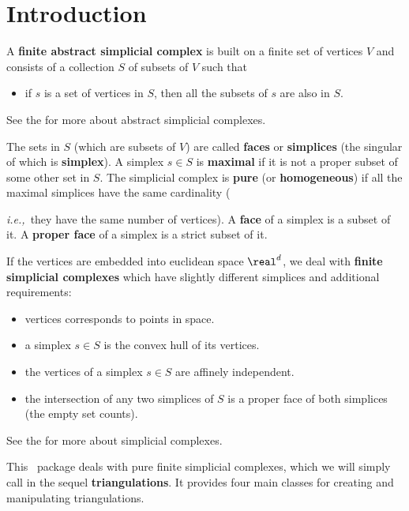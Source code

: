{

\def\note#1{ {\color{red}
  \textsf{$\langle\!\langle${#1}$\rangle\!\rangle$}}
}

\section{Introduction\label{triangulation:intro}}

A \textbf{finite abstract simplicial complex} is built on a finite set of
vertices $V$ and consists of a collection $S$ of subsets of $V$ such that
\begin{itemize}
\item if $s$ is a set of vertices in $S$, then all the subsets of $s$ are also
in $S$.
\end{itemize}
See the
 for more about abstract simplicial complexes.

The sets in $S$ (which are subsets of $V$) are called
\textbf{faces} or \textbf{simplices} (the
singular of which is \textbf{simplex}).
%
A simplex $s\in S$ is \textbf{maximal} if it is not a proper subset of some other
set in $S$. The simplicial complex is \textbf{pure} (or \textbf{homogeneous})
if all the maximal simplices have the same cardinality ({\emph{i.e.,}\ they have the same
number of vertices). A \textbf{face} of a simplex is a subset of it. A
\textbf{proper face} of a simplex is a strict subset of it.

If the vertices are embedded into euclidean space $\real^d$, we deal with
\textbf{finite simplicial complexes} which have slightly different simplices
and additional requirements:
\begin{itemize}
\item vertices corresponds to points in space.
\item a simplex $s\in S$ is the convex hull of its vertices.
\item the vertices of a simplex $s\in S$ are affinely independent.
\item the intersection of any two simplices of $S$ is a proper face of both
simplices (the empty set counts).
\end{itemize}
See the  for more about simplicial complexes.

This \cgal\ package deals with pure finite simplicial complexes, which
we will simply call in the sequel \textbf{triangulations}. It provides four main classes
for creating and manipulating triangulations.

}}
